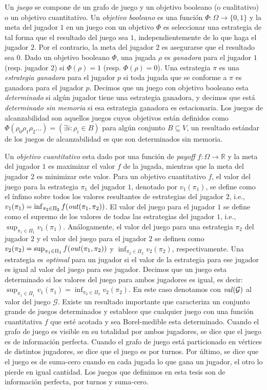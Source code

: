 Un \emph{juego} se compone de un grafo de juego y un objetivo booleano (o cualitativo) o un objetivo cuantitativo. Un \emph{objetivo booleano} es una función $\Phi: \Omega \rightarrow \{0, 1\}$ y la meta del jugador $1$ en un juego con un objetivo $\Phi$ es seleccionar una estrategia de tal forma que el resultado del juego sea $1$, independientemente de lo que haga el jugador $2$. Por el contrario, la meta del jugador $2$ es asegurarse que el resultado sea $0$. Dado un objetivo booleano $\Phi$, una jugada $\rho$ es \emph{ganadora} para el jugador $1$ (resp. jugador $2$) si  $\Phi(\rho) = 1$ (resp. $\Phi(\rho) = 0$). Una estrategia $\pi$ es una \emph{estrategia ganadora} para el jugador $p$ si toda jugada que se conforme a $\pi$ es ganadora para el jugador $p$. Decimos que un juego con objetivo booleano esta \emph{determinado} si algún jugador tiene una estrategia ganadora, y decimos que está \emph{determinado sin memoria} si esa estrategia ganadora es estacionaria. Los juegos de alcanzabilidad son aquellos juegos cuyos objetivos están definidos como $\Phi(\rho_0 \rho_1 \rho_2 \dots) = (\exists i : \rho_i \in B)$ para algún conjunto $B \subseteq V$, un resultado estándar de los juegos de alcanzabilidad es que son determinados sin memoria.

Un \emph{objetivo cuantitativo} esta dado por una función de \emph{payoff} $f: \Omega \rightarrow \mathbb{R}$ y la meta del jugador $1$ es maximizar el valor $f$ de la jugada, mientras que la meta del jugador $2$ es minimizar este valor. Para un objetivo cuantitativo $f$, el valor del juego para la estrategia $\pi_1$ del jugador $1$, denotado por $v_1(\pi_1)$, se define como el ínfimo sobre todos los valores resultantes de estrategias del jugador $2$, i.e., $v_1(\pi_1) = \inf_{\pi_2 \in \Pi_2} f(\mathit{out}(\pi_1, \pi_2))$. El valor del juego para el jugador $1$ se define como el supremo de los valores de todas las estrategias del jugador $1$, i.e., $\sup_{\pi_1 \in \Pi_1} v_1(\pi_1)$. Análogamente, el valor del juego para una estrategia $\pi_2$ del jugador $2$ y el valor del juego para el jugador $2$ se definen como $v_2(\pi_2) = \sup_{\pi_1 \in \Pi_1} f(\mathit{out}(\pi_1, \pi_2))$ 
y $\inf_{\pi_2 \in \Pi_2} v_2(\pi_2)$, respectivamente.
Una estrategia es \emph{optimal} para un jugador si el valor de la estrategia para ese jugador es igual al valor del juego para ese jugador. Decimos que un juego esta determinado si los valores del juego para ambos jugadores es igual, es decir:
$\sup_{\pi_1 \in \Pi_1} v_1(\pi_1) = \inf_{\pi_2 \in \Pi_2} v_2(\pi_2)$. En este caso denotamos con $\mathit{val}(\mathcal{G})$ al valor del juego $\mathcal{G}$.
Existe un resultado importante \cite{Martin98} que caracteriza un conjunto grande de juegos determinados y establece que cualquier juego con una función cuantitativa $f$ que esté acotada y sea Borel-medible esta determinado.
Cuando el grafo de juego es visible en su totalidad por ambos jugadores, se dice que el juego es de información perfecta. Cuando el grafo de juego está particionado en vértices de distintos jugadores, se dice que el juego es por turnos.
Por último, se dice que el juego es de suma-cero cuando en cada jugada lo que gana un jugador, el otro lo pierde en igual cantidad. Los juegos que definimos en esta tesis son de información perfecta, por turnos y suma-cero.

